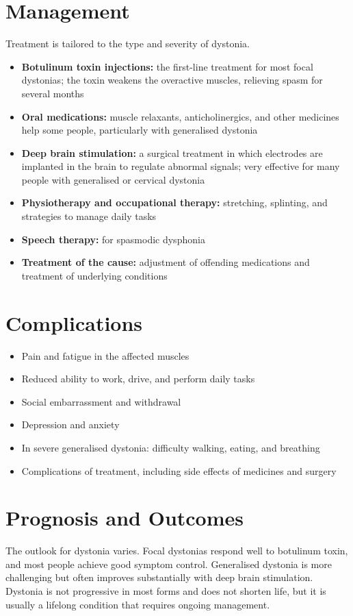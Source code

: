 \section*{Management}
Treatment is tailored to the type and severity of dystonia.
\begin{itemize}
    \item \textbf{Botulinum toxin injections:} the first-line treatment for most focal dystonias; the toxin weakens the overactive muscles, relieving spasm for several months
    \item \textbf{Oral medications:} muscle relaxants, anticholinergics, and other medicines help some people, particularly with generalised dystonia
    \item \textbf{Deep brain stimulation:} a surgical treatment in which electrodes are implanted in the brain to regulate abnormal signals; very effective for many people with generalised or cervical dystonia
    \item \textbf{Physiotherapy and occupational therapy:} stretching, splinting, and strategies to manage daily tasks
    \item \textbf{Speech therapy:} for spasmodic dysphonia
    \item \textbf{Treatment of the cause:} adjustment of offending medications and treatment of underlying conditions
\end{itemize}

\section*{Complications}
\begin{itemize}
    \item Pain and fatigue in the affected muscles
    \item Reduced ability to work, drive, and perform daily tasks
    \item Social embarrassment and withdrawal
    \item Depression and anxiety
    \item In severe generalised dystonia: difficulty walking, eating, and breathing
    \item Complications of treatment, including side effects of medicines and surgery
\end{itemize}

\section*{Prognosis and Outcomes}
The outlook for dystonia varies. Focal dystonias respond well to botulinum toxin, and most people achieve good symptom control. Generalised dystonia is more challenging but often improves substantially with deep brain stimulation. Dystonia is not progressive in most forms and does not shorten life, but it is usually a lifelong condition that requires ongoing management.

